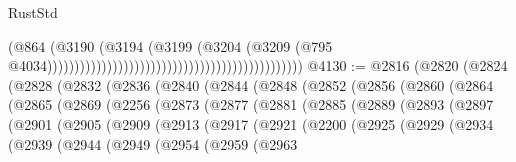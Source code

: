 \begin{lexlean}{RustStd}
\begin{coremodule}
                                                                                    (@864
                                                                                      (@3190
                                                                                        (@3194
                                                                                          (@3199
                                                                                            (@3204
                                                                                              (@3209
                                                                                                (@795
                                                                                                  @4034)))))))))))))))))))))))))))))))))))))))))))))))
@4130 := @2816
    (@2820
      (@2824
        (@2828
          (@2832
            (@2836
              (@2840
                (@2844
                  (@2848
                    (@2852
                      (@2856
                        (@2860
                          (@2864
                            (@2865
                              (@2869
                                (@2256
                                  (@2873
                                    (@2877
                                      (@2881
                                        (@2885
                                          (@2889
                                            (@2893
                                              (@2897
                                                (@2901
                                                  (@2905
                                                    (@2909
                                                      (@2913
                                                        (@2917
                                                          (@2921
                                                            (@2200
                                                              (@2925
                                                                (@2929
                                                                  (@2934
                                                                    (@2939
                                                                      (@2944
                                                                        (@2949
                                                                          (@2954
                                                                            (@2959
                                                                              (@2963

\end{coremodule}
\end{lexlean}

